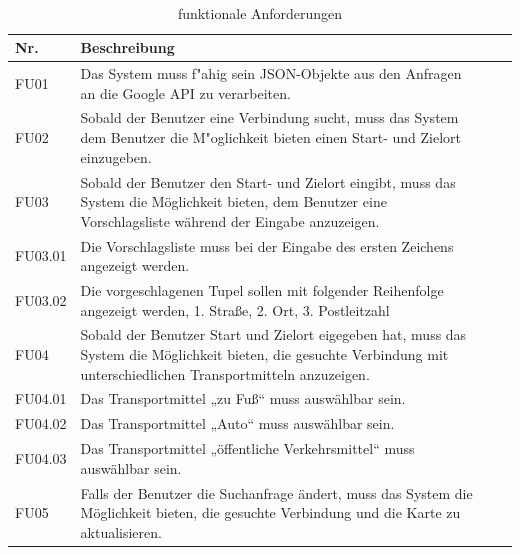 \documentclass[a4paper, 11pt]{scrreprt}
\begin{document}
\begin{table}[H]

\caption{funktionale Anforderungen}

\ \\

\par

\label{tab:Tabelle1}

\centering

\begin{tabular}{|p{2.5cm} p{12cm}| ll}

\hline

Nr.	& Beschreibung\\

\hline

FU01 &	Das System muss f"ahig sein JSON-Objekte aus den Anfragen an die Google API zu verarbeiten.\\

\hline
FU02 &	Sobald der Benutzer eine Verbindung sucht, muss das System dem Benutzer die M"oglichkeit bieten einen Start- und Zielort einzugeben.\\

\hline
FU03& Sobald der Benutzer den Start- und Zielort eingibt, muss das System die Möglichkeit bieten, dem Benutzer eine Vorschlagsliste während der Eingabe anzuzeigen.\\

\hline
FU03.01	&Die Vorschlagsliste muss bei der Eingabe des ersten Zeichens angezeigt werden.\\

\hline
FU03.02	&Die vorgeschlagenen Tupel sollen mit folgender Reihenfolge angezeigt werden, 1. Straße, 2. Ort, 3. Postleitzahl\\

\hline
FU04	&Sobald der Benutzer Start und Zielort eigegeben hat, muss das System die Möglichkeit bieten, die gesuchte Verbindung mit unterschiedlichen Transportmitteln anzuzeigen.\\

\hline
FU04.01	&Das Transportmittel „zu Fuß“ muss auswählbar sein.\\

\hline
FU04.02&	Das Transportmittel  „Auto“ muss auswählbar sein.\\

\hline
FU04.03	&Das Transportmittel „öffentliche Verkehrsmittel“ muss auswählbar sein.\\

\hline
FU05	&Falls der Benutzer die Suchanfrage ändert, muss das System die Möglichkeit bieten, die gesuchte Verbindung und die Karte zu aktualisieren.\\


\end{tabular}
\end{table}
\end{document}
